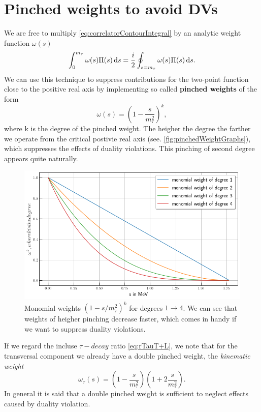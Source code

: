\documentclass[../../index.tex]{subfiles}
\begin{document}
\section{Pinched weights to avoid DVs}
We are free to multiply \cref{eq:correlatorContourIntegral} by an analytic weight function $\omega(s)$
\begin{equation}
  \int_0^{m_\tau} \omega(s) \Pi(s) \dif s = \frac{i}{2} \oint_{s=m_\tau} \omega(s) \Pi(s) \dif s.
\end{equation}
We can use this technique to suppress contributions for the two-point function
close to the positive real axis by implementing so called \textbf{pinched
  weights} of the form
\begin{equation}
  \omega(s) = (1-\frac{s}{m_\tau^2})^k,
\end{equation}
where k is the degree of the pinched weight. The heigher the degree the farther
we operate from the critical postivie real axis (see. \cref{fig:pinchedWeightGraphs}), which suppresses the effects of
duality violations. This pinching of second degree appears quite naturally.
\begin{figure}
  \centering
  \includegraphics[width=\textwidth]{./images/monomialWeightGraphs.png}
  \caption{Monomial weights $(1-s/m_\tau^2)^k$ for degrees $1\to4$. We can see
    that weights of heigher pinching decrease faster, which comes in handy if we
  want to suppress duality violations.}
  \label{fig:monomialWeightGraphs}
\end{figure}
If we regard the incluse $\tau-decay$ ratio \cref{eq:rTauT+L}, we note that for the
transversal component we already have a double pinched weight, the
\textit{kinematic weight}
\begin{equation}
  \label{eq:kinematicWeight}
  \omega_\tau(s) = \left( 1-\frac{s}{m_\tau^2} \right) \left( 1 + 2 \frac{s}{m_\tau^2} \right).
\end{equation}
In general it is said that a double pinched weight is sufficient to neglect
effects caused by duality violation.
\end{document}
